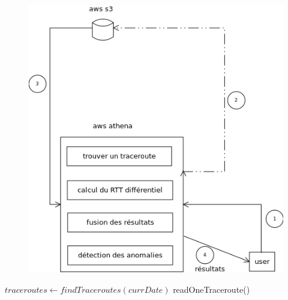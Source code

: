 \begin{figure}[H]
\centering
\includegraphics[width=1\linewidth]{illustrations/tentative-athena-all}
\caption{}
\label{fig:tentative-athena-all}
\end{figure}


  		\State $ traceroutes  \leftarrow  findTraceroutes(currDate) $
  		readOneTraceroute()
  		\EndFor
  		
